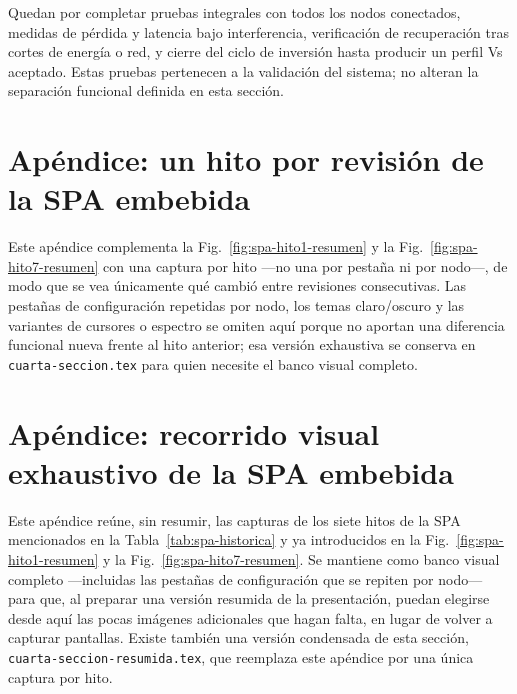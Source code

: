 Quedan por completar pruebas integrales con todos los nodos conectados, medidas
de p\'erdida y latencia bajo interferencia, verificaci\'on de recuperaci\'on tras
cortes de energ\'ia o red, y cierre del ciclo de inversi\'on hasta producir un
perfil Vs aceptado. Estas pruebas pertenecen a la validaci\'on del sistema; no
alteran la separaci\'on funcional definida en esta secci\'on.

\ifdefined\cuartaresumen\else{}\fi

\clearpage
\ifnum{}

\section*{Ap\'endice: un hito por revisi\'on de la SPA embebida}
\label{sec:anexo-spa-visual}

Este ap\'endice complementa la Fig.~\ref{fig:spa-hito1-resumen} y la
Fig.~\ref{fig:spa-hito7-resumen} con una captura por hito ---no una por pesta\~na
ni por nodo---, de modo que se vea \'unicamente qu\'e cambi\'o entre revisiones
consecutivas. Las pesta\~nas de configuraci\'on repetidas por nodo, los temas
claro/oscuro y las variantes de cursores o espectro se omiten aqu\'i porque no
aportan una diferencia funcional nueva frente al hito anterior; esa versi\'on
exhaustiva se conserva en \texttt{cuarta-seccion.tex} para quien necesite el
banco visual completo.



\else

\section*{Ap\'endice: recorrido visual exhaustivo de la SPA embebida}
\label{sec:anexo-spa-visual}

Este ap\'endice re\'une, sin resumir, las capturas de los siete hitos de la SPA
mencionados en la Tabla~\ref{tab:spa-historica} y ya introducidos en la
Fig.~\ref{fig:spa-hito1-resumen} y la Fig.~\ref{fig:spa-hito7-resumen}. Se
mantiene como banco visual completo ---incluidas las pesta\~nas de configuraci\'on
que se repiten por nodo--- para que, al preparar una versi\'on resumida de la
presentaci\'on, puedan elegirse desde aqu\'i las pocas im\'agenes adicionales que
hagan falta, en lugar de volver a capturar pantallas. Existe tambi\'en una
versi\'on condensada de esta secci\'on, \texttt{cuarta-seccion-resumida.tex}, que
reemplaza este ap\'endice por una \'unica captura por hito.



\fi
